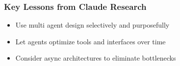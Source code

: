\begin{frame}[fragile]\frametitle{Key Lessons from Claude Research}
    \begin{itemize}
        \item Use multi agent design selectively and purposefully
        \item Let agents optimize tools and interfaces over time
        \item Consider async architectures to eliminate bottlenecks
    \end{itemize}
\end{frame}
